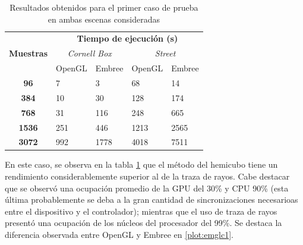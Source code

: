 \begin{table}[H]
	\label{tab:tablecaso1}
	\centering
	\begin{tabular}{|c|l|l|l|l|}
		\hline
		\multirow{3}{*}{\textbf{Muestras}} & \multicolumn{4}{c|}{\textbf{Tiempo de ejecución (s)}}                                                                                  \\ \cline{2-5} 
		& \multicolumn{2}{c|}{\textit{Cornell Box}}                 & \multicolumn{2}{c|}{\textit{Street}}                      \\ \cline{2-5} 
		& \multicolumn{1}{c|}{OpenGL} & \multicolumn{1}{c|}{Embree} & \multicolumn{1}{c|}{OpenGL} & \multicolumn{1}{c|}{Embree} \\ \hline
		\textbf{96}                        & 7                           & 3                           & 68                          & 14                          \\ \hline
		\textbf{384}                       & 10                          & 30                          & 128                         & 174                         \\ \hline
		\textbf{768}                       & 31                          & 116                         & 248                         & 665                         \\ \hline
		\textbf{1536}                      & 251                         & 446                         & 1213                        & 2565                        \\ \hline
		\textbf{3072}                      & 992                         & 1778                        & 4018                        & 7511                        \\ \hline
	\end{tabular}
	\caption{Resultados obtenidos para el primer caso de prueba en ambas escenas consideradas}
\end{table}

En este caso, se observa en la tabla \ref{tab:tablecaso1} que el método del hemicubo tiene un rendimiento considerablemente superior al de la traza de rayos. Cabe destacar que se observó una ocupación promedio de la GPU del 30\% y CPU 90\% (esta última probablemente se deba a la gran cantidad de sincronizaciones necesarioas entre el dispositivo y el controlador); mientras que el uso de traza de rayos presentó una ocupación de los núcleos del procesador del 99\%. Se destaca la diferencia observada entre OpenGL y Embree en \ref{plot:emglc1}.

